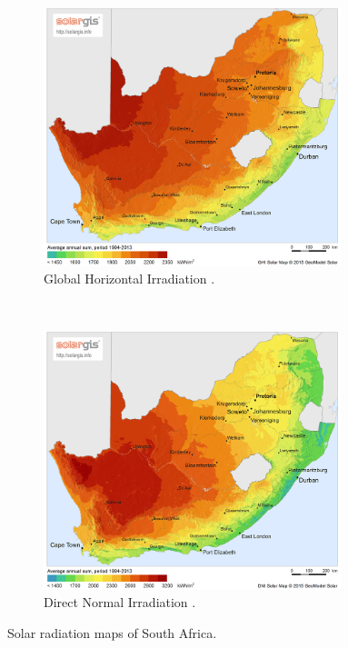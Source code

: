 \begin{figure}[h!]
        \centering
        \begin{subfigure}[b]{0.5\textwidth}
                \centering
                \includegraphics[width=0.95\textwidth]{FIG/SA_GHI}
                \caption{Global Horizontal Irradiation \cite{SolarGIS2015a}.}\label{fig:bild-links}
        \end{subfigure}%
        ~
        \begin{subfigure}[b]{0.5\textwidth}
                \centering
                \includegraphics[width=0.95\textwidth]{FIG/SA_DNI}
                \caption{Direct Normal Irradiation \cite{SolarGIS2015b}.}\label{fig:bild-rechts}
        \end{subfigure}
        \caption{Solar radiation maps of South Africa.}\label{irradiation}
\end{figure}
\pagebreak
